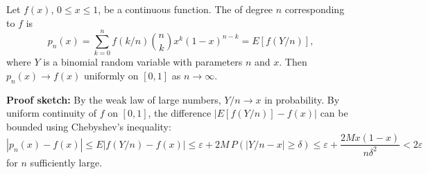 Let $f(x)$, $0 \leq x \leq 1$, be a continuous function. The  of degree $n$ corresponding to $f$ is
$$p_n(x) = \sum_{k=0}^{n} f(k/n) \binom{n}{k} x^k (1-x)^{n-k} = E[f(Y/n)],$$
where $Y$ is a binomial random variable with parameters $n$ and $x$. Then $p_n(x) \to f(x)$ uniformly on $[0,1]$ as $n \to \infty$.

\textbf{Proof sketch:} By the weak law of large numbers, $Y/n \to x$ in probability. By uniform continuity of $f$ on $[0,1]$, the difference $|E[f(Y/n)] - f(x)|$ can be bounded using Chebyshev's inequality:
$$|p_n(x) - f(x)| \leq E|f(Y/n) - f(x)| \leq \varepsilon + 2M \, P(|Y/n - x| \geq \delta) \leq \varepsilon + \frac{2M x(1-x)}{n\delta^2} < 2\varepsilon$$
for $n$ sufficiently large.
